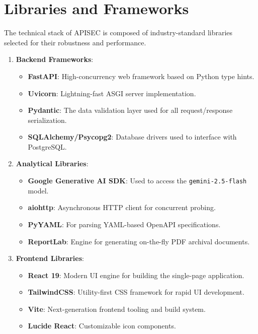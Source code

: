 \documentclass{fisatprojectfinal}
\begin{document}
\section{Libraries and Frameworks}
The technical stack of APISEC is composed of industry-standard libraries selected for their robustness and performance.

\begin{enumerate}
    \item \textbf{Backend Frameworks}:
    \begin{itemize}
        \item \textbf{FastAPI}: High-concurrency web framework based on Python type hints.
        \item \textbf{Uvicorn}: Lightning-fast ASGI server implementation.
        \item \textbf{Pydantic}: The data validation layer used for all request/response serialization.
        \item \textbf{SQLAlchemy/Psycopg2}: Database drivers used to interface with PostgreSQL.
    \end{itemize}
    \item \textbf{Analytical Libraries}:
    \begin{itemize}
        \item \textbf{Google Generative AI SDK}: Used to access the \texttt{gemini-2.5-flash} model.
        \item \textbf{aiohttp}: Asynchronous HTTP client for concurrent probing.
        \item \textbf{PyYAML}: For parsing YAML-based OpenAPI specifications.
        \item \textbf{ReportLab}: Engine for generating on-the-fly PDF archival documents.
    \end{itemize}
    \item \textbf{Frontend Libraries}:
    \begin{itemize}
        \item \textbf{React 19}: Modern UI engine for building the single-page application.
        \item \textbf{TailwindCSS}: Utility-first CSS framework for rapid UI development.
        \item \textbf{Vite}: Next-generation frontend tooling and build system.
        \item \textbf{Lucide React}: Customizable icon components.
    \end{itemize}
\end{enumerate}
\end{document}
